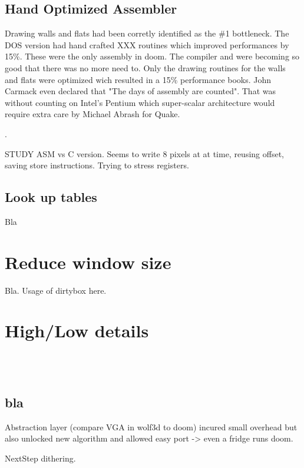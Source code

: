 \subsection{Hand Optimized Assembler}
Drawing walls and flats had been corretly identified as the \#1 bottleneck. The DOS version had hand crafted XXX routines which improved performances by 15\%. These were the only assembly in doom. The compiler and  were becoming so good that there was no more need to. Only the drawing routines for the walls and flats were optimized wich resulted in a 15\% performance books. John Carmack even declared that "The days of assembly are counted". That was without counting on Intel's Pentium which super-scalar architecture would require extra care by Michael Abrash for Quake.\\
\par
 .
 \par
 STUDY ASM vs C version. Seems to write 8 pixels at at time, reusing offset, saving store instructions. Trying to stress registers.\\
 \par

\subsection{Look up tables}
Bla
\section{Reduce window size}
Bla. Usage of dirtybox here.
\section{High/Low details}

\\
\\


\subsection{bla}
\par

Abstraction layer (compare VGA in wolf3d to doom) incured small overhead but also unlocked new algorithm and allowed easy port -> even a fridge runs doom.\\
\par
NextStep dithering.\\
\\ 


